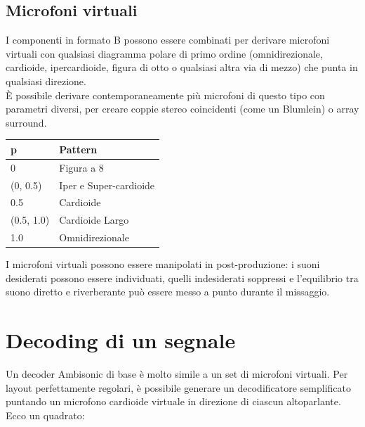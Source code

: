 \subsection{Microfoni virtuali}

I componenti in formato B possono essere combinati per derivare microfoni virtuali con qualsiasi diagramma polare di primo ordine (omnidirezionale, cardioide, ipercardioide, figura di otto o qualsiasi altra via di mezzo) che punta in qualsiasi direzione.
 \\È possibile derivare contemporaneamente più microfoni di questo tipo con parametri diversi, per creare coppie stereo coincidenti (come un Blumlein) o array surround.

 \begin{center}
 \captionsetup{type=table}
\begin{tabular}{||p{3.0cm}|p{3.0cm}||} 
      \hline\hline
      p & Pattern \\
      \hline\hline
      0 & Figura a 8 \\
      \hline\hline
      (0, 0.5) & Iper e Super-cardioide\\
      \hline\hline
      0.5 & Cardioide \\
      \hline\hline
      (0.5, 1.0) & Cardioide Largo \\
      \hline\hline
      1.0 & Omnidirezionale \\
      \hline\hline
      \end{tabular}
\end{center}

I microfoni virtuali possono essere manipolati in post-produzione: i suoni desiderati possono essere individuati,
 quelli indesiderati soppressi e l'equilibrio tra suono diretto e riverberante può essere messo a punto durante il missaggio.
 
\section{Decoding di un segnale}

Un decoder Ambisonic di base è molto simile a un set di microfoni virtuali.
Per layout perfettamente regolari, è possibile generare un decodificatore semplificato puntando un microfono cardioide virtuale in direzione di ciascun altoparlante.
\\Ecco un quadrato:

